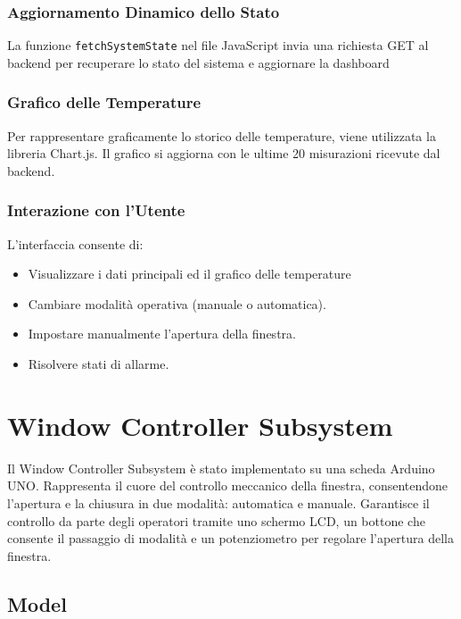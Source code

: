 \documentclass{report}
\begin{document}
\subsection{Aggiornamento Dinamico dello Stato}
La funzione \texttt{fetchSystemState} nel file JavaScript invia una richiesta GET al backend per recuperare lo stato del sistema e aggiornare la dashboard

\subsection{Grafico delle Temperature}
Per rappresentare graficamente lo storico delle temperature, viene utilizzata la libreria Chart.js. Il grafico si aggiorna con le ultime 20 misurazioni ricevute dal backend.

\subsection{Interazione con l’Utente}
L’interfaccia consente di:
\begin{itemize}
    \item Visualizzare i dati principali ed il grafico delle temperature
    \item Cambiare modalità operativa (manuale o automatica).
    \item Impostare manualmente l’apertura della finestra.
    \item Risolvere stati di allarme.
\end{itemize}
%
%
\chapter{Window Controller Subsystem}
\par {
Il Window Controller Subsystem è stato implementato su una scheda Arduino UNO. Rappresenta il cuore del controllo meccanico della finestra, consentendone l'apertura e la chiusura in due modalità: automatica e manuale. Garantisce il controllo da parte degli operatori tramite uno schermo LCD, un bottone che consente il passaggio di modalità e un potenziometro per regolare l'apertura della finestra.
}

\section{Model}
\end{document}
